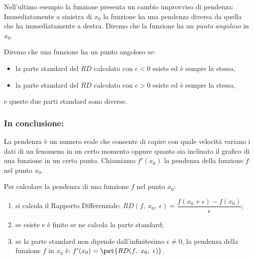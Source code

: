 Nell'ultimo esempio la funzione presenta un cambio improvviso di pendenza:
Immediatamente a sinistra di \(x_0\) la funzione ha una pendenza diversa 
da quella che ha immediatamente a destra. 
Diremo che la funzione ha un \emph{punto angoloso} in \(x_0\).

\begin{definizione}
Diremo che una funzione ha un punto angoloso se: 
\begin{itemize} [nosep]
\item 
la parte standard del \(RD\) calcolato con 
\(\epsilon < 0\) esiste ed è sempre la stessa,
\item 
la parte standard del \(RD\) calcolato con 
\(\epsilon > 0\) esiste ed è sempre la stessa,
\end{itemize}
e queste due parti standard sono diverse.
\end{definizione}

\subsubsection{In conclusione:} 
La pendenza è un numero reale che consente di capire con quale 
velocità variano i dati di un fenomeno in un certo momento oppure quanto sia 
inclinato il grafico di una funzione in un certo punto.
Chiamiamo \(f'(x_0)\) la pendenza della funzione \(f\) nel punto \(x_0\).

\begin{procedura}
\label{proc:ricetta_pendenza}
Per calcolare la pendenza di una funzione \(f\) nel punto \(x_0\):
\begin{enumerate}
\item si calcola il Rapporto Differenziale:
\(RD(f,~x_0,~\epsilon)= \dfrac{f(x_0+\epsilon) -f(x_0)}{\epsilon}\);
\item se esiste e è finito se ne calcola la parte standard;
\item se la parte standard non dipende dall'infinitesimo 
\(\epsilon \neq 0\), la pendenza della funzione \(f\) in \(x_0\) è:
\(f'(x_0) = \pst{RD(f,~x_0,~\epsilon)}\).
\end{enumerate}
\end{procedura}

